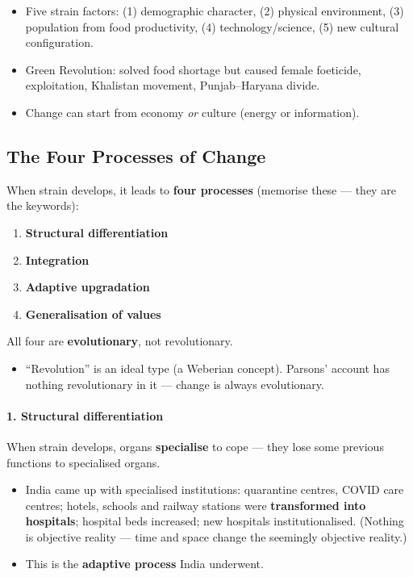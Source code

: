 \begin{QuickRevision}
\begin{itemize}
\item Five strain factors: (1) demographic character, (2) physical environment, (3) population from food productivity, (4) technology/science, (5) new cultural configuration.
\item Green Revolution: solved food shortage but caused female foeticide, exploitation, Khalistan movement, Punjab--Haryana divide.
\item Change can start from economy \textit{or} culture (energy or information).
\end{itemize}
\end{QuickRevision}

\sectiondivider

\subsection{The Four Processes of Change}

When strain develops, it leads to \textbf{four processes} (memorise these --- they are the keywords):
\begin{enumerate}
\item \textbf{Structural differentiation}
\item \textbf{Integration}
\item \textbf{Adaptive upgradation}
\item \textbf{Generalisation of values}
\end{enumerate}
All four are \textbf{evolutionary}, not revolutionary.

\begin{CriticalPoint}
\begin{itemize}
\item ``Revolution'' is an ideal type (a Weberian concept). Parsons' account has nothing revolutionary in it --- change is always evolutionary.
\end{itemize}
\end{CriticalPoint}

\paragraph{1. Structural differentiation}
When strain develops, organs \textbf{specialise} to cope --- they lose some previous functions to specialised organs.

\begin{ExampleBox}
\begin{itemize}
\item India came up with specialised institutions: quarantine centres, COVID care centres; hotels, schools and railway stations were \textbf{transformed into hospitals}; hospital beds increased; new hospitals institutionalised. (Nothing is objective reality --- time and space change the seemingly objective reality.)
\item This is the \textbf{adaptive process} India underwent.
\end{itemize}
\end{ExampleBox}

